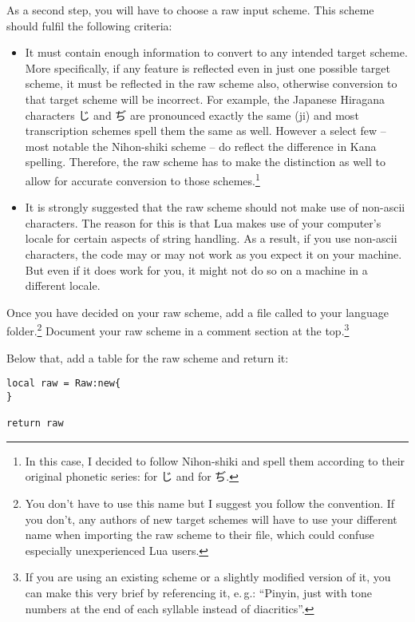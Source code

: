 \documentclass{ltxdockit}
\begin{document}
As a second step, you will have to choose a raw input scheme. This scheme should
fulfil the following criteria:

\begin{itemize}
  \item It must contain enough information to convert to any intended target
    scheme. More specifically, if any feature is reflected even in just one
    possible target scheme, it must be reflected in the raw scheme also,
    otherwise conversion to that target scheme will be incorrect. For example,
    the Japanese Hiragana characters じ and ぢ are pronounced exactly the same
    (ji) and most transcription schemes spell them the same as well. However
    a select few -- most notable the Nihon-shiki scheme -- do reflect the
    difference in Kana spelling. Therefore, the raw scheme has to make the
    distinction as well to allow for accurate conversion to those
    schemes.\footnote{In this case, I decided to follow Nihon-shiki and spell
      them according to their original phonetic series:  for じ and
     for ぢ.}
  \item It is strongly suggested that the raw scheme should not make use of
    non-ascii characters. The reason for this is that Lua makes use of your
    computer's locale for certain aspects of string handling. As a
    result, if you
    use non-ascii characters, the code may or may not work as you expect it on
    your machine. But even if it does work for you, it might not do so on
    a machine in a different locale.
\end{itemize}

Once you have decided on your raw scheme, add a file called  to
your language folder.\footnote{You don't have to use this name but I suggest
  you follow the convention. If you don't, any authors of new target schemes
  will have to use your different name when importing the raw scheme to their
file, which could confuse especially unexperienced Lua users.} Document your raw
scheme in a comment section at the top.\footnote{If you are using an existing
  scheme or a slightly modified version of it, you can make this very brief by
  referencing it, e.\,g.: \enquote{Pinyin, just with tone numbers at the end of
each syllable instead of diacritics}.}

Below that, add a table for the raw scheme and return it:

\begin{lstlisting}
local raw = Raw:new{
}

return raw
\end{lstlisting}
\end{document}
